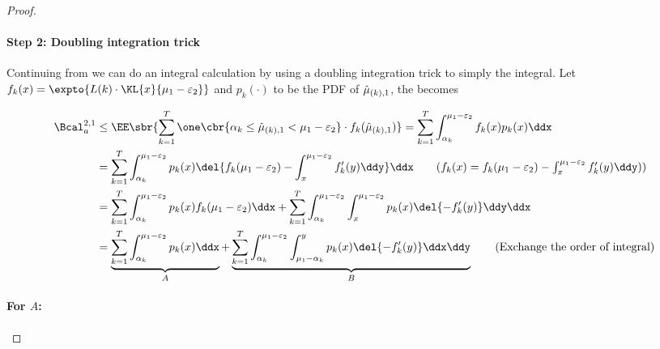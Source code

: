 \begin{proof}
    \paragraph{Step 2: Doubling integration trick}
    Continuing from  we can do an integral calculation by using a doubling integration trick to simply the integral.
    Let $f_k(x) = \expto{ L(k)\cdot\KL{x}{\mu_1-\varepsilon_2}}$ and $p_k(\cdot)$ to be the PDF of ${\hat\mu}_{(k), 1}$, the  becomes

    \begin{align*}
    	 \Bcal^{2,1}_a
    	 & \leq
    	    \EE\sbr{ 
    	        \sum_{k=1}^{T}
    	        \one\cbr{\alpha_k \leq \hmu_{(k), 1} < \mu_1 - \varepsilon_2} 
    	        \cdot 
    	        f_k(\hmu_{(k), 1})
    	        } 
    	= 
    	    \sum_{k=1}^{T}
    	    \int_{\alpha_k}^{\mu_1 - \varepsilon_2} f_k(x) p_k(x) \ddx
    	 \\
    	 & = 
    	    \sum_{k=1}^{T}
    	        \int_{\alpha_k}^{\mu_1 - \varepsilon_2} p_k(x) 
                    \del{ f_k(\mu_1 - \varepsilon_2) -
    	               \int_x^{\mu_1 - \varepsilon_2} f_k'(y) \ddy } \ddx
    	            \tag{$f_k(x) = f_k(\mu_1-\varepsilon_2) - \int_x^{\mu_1-\varepsilon_2} f_k'(y) \ddy)$}
    	 \\
    	 & = 
    	    \sum_{k=1}^{T}
    	        \int_{\alpha_k}^{\mu_1 - \varepsilon_2} 
    	        p_k(x) 
    	        f_k(\mu_1 - \varepsilon_2) \ddx +
    	    \sum_{k=1}^{T}         
    	        \int_{\alpha_k}^{\mu_1 - \varepsilon_2} 
    	        \int_x^{\mu_1 - \varepsilon_2} 
    	            p_k(x) \del{-f_k'(y)} \ddy \ddx
    	  \\
    	 & = 
    	    \underbrace{
    	    \sum_{k=1}^{T}
    	        \int_{\alpha_k}^{\mu_1 - \varepsilon_2}  
    	        p_k(x)\ddx
    	        }_{A} 
                +
    	    \underbrace{
    	    \sum_{k=1}^{T}
    	        \int_{\alpha_k}^{\mu_1 - \varepsilon_2}\int^{y}_{\mu_1 - \alpha_k} 
    	        p_k(x) \del{-f_k'(y)} \ddx \ddy
    	        }_{B}
    	            \tag{Exchange the order of integral}
    \end{align*}

    \paragraph{For $A$:}


\end{proof}
